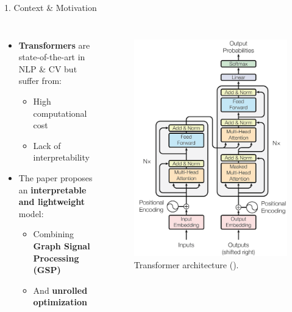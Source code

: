 \documentclass[aspectratio=169,xcolor=dvipsnames]{beamer}
\begin{document}
\begin{frame}{1. Context \& Motivation}

    \begin{columns}[c] %
        \begin{itemize}
            \item \textbf{Transformers} are state-of-the-art in NLP \& CV but suffer from:
            \begin{itemize}
                \item High computational cost
                \item Lack of interpretability
            \end{itemize}
            \vspace{0.5cm}
            \item The paper proposes an \textbf{interpretable and lightweight} model:
            \begin{itemize}
                \item Combining \textbf{Graph Signal Processing (GSP)}
                \item And \textbf{unrolled optimization}
            \end{itemize}
        \end{itemize}

        \begin{figure}
            \centering
            \includegraphics[width=0.8\linewidth]{transformers.png}
            \tiny Transformer architecture (\cite{vaswani2017attention}).
        \end{figure}


\end{columns}
\end{frame}
\end{document}
